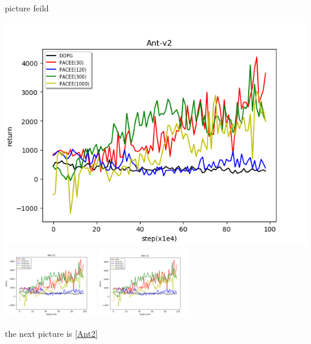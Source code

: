 \documentclass{article}
\begin{document}
picture feild

    \includegraphics{Ant}
    \includegraphics[height=3cm]{Ant}
    \includegraphics[width=4cm]{Ant}

    the next picture is \ref{Ant2}
\end{document}
